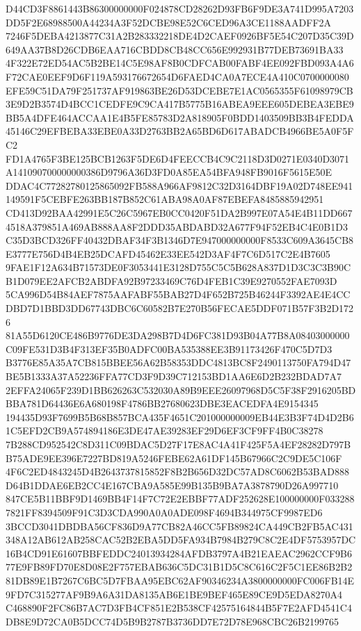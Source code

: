 \documentclass[UTF8,fontset=fandol,zihao=-4,a4paper]{ctexart}
\begin{document}
{{D44CD3F8861443B86300000000F024878CD28262D93FB6F9DE3A741D995A7203DD5F2E68988500A44234A3F52DCBE98E52C6CED96A3CE1188AADFF2A
7246F5DEBA4213877C31A2B283332218DE4D2CAEF0926BF5E54C207D35C39D649AA37B8D26CDB6EAA716CBDD8CB48CC656E992931B77DEB73691BA33
4F322E72ED54AC5B2BE14C5E98AF8B0CDFCAB00FABF4EE092FBD093A4A6F72CAE0EEF9D6F119A593176672654D6FAED4CA0A7ECE4A410C0700000080
EFE59C51DA79F251737AF919863BE26D53DCEBE7E1AC0565355F61098979CB3E9D2B3574D4BCC1CEDFE9C9CA417B5775B16ABEA9EEE605DEBEA3EBE9
BB5A4DFE464ACCAA1E4B5FE85783D2A818905F0BDD1403509BB3B4FEDDA45146C29EFBEBA33EBE0A33D2763BB2A65BD6D617ABADCB4966BE5A0F5FC2
FD1A4765F3BE125BCB1263F5DE6D4FEECCB4C9C2118D3D0271E0340D3071A141090700000000386D9796A36D3FD0A85EA54BFA948FB9016F5615E50E
DDAC4C77282780125865092FB588A966AF9812C32D3164DBF19A02D748EE941149591F5CEBFE263BB187B852C61ABA98A0AF87EBEFA8485885942951
CD413D92BAA42991E5C26C5967EB0CC0420F51DA2B997E07A54E4B11DD6674518A379851A469AB888AA8F2DDD35ABDABD32A677F94F52EB4C4E0B1D3
C35D3BCD326FF40432DBAF34F3B1346D7E947000000000F8533C609A3645CB8E3777E756D4B4EB25DCAFD45462E33EE542D3AF4F7C6D517C2E4B7605
9FAE1F12A634B71573DE0F3053441E3128D755C5C5B628A837D1D3C3C3B90CB1D079EE2AFCB2ABDFA92B97233469C76D4FEB1C39E9270552FAE7093D
5CA996D54B84AEF7875AAFABF55BAB27D4F652B725B46244F3392AE4E4CCDBD7D1BBD3DD67743DBC6C60582B7E270B56FECAE5DDF071B57F3B2D1726
81A55D6120CE486B9776DE3DA298B7D4D6FC381D93B04A77B8A08403000000C09FE531D3B4F313EF35B0ADFC00BA535388EE3B91173426F470C5D7D3
B3776E85A35A7CB815BBEE56A62B58353DDC4813BC8F2490113750FA794D47BE5B1333A37A52236FFA77CD3F9D39C712153BD1AA6E6D2B232BDAD7A7
2EFFA24065F239D1BB626263C532030A89B9EEE26097968D5C5F38F2916205BDBBA781D64436E6A680198F4786BB27680623DBE3EACEDFA4E9154345
194435D93F7699B5B68B857BCA435F4651C201000000009EB44E3B3F74D4D2B61C5EFD2CB9A574894186E3DE47AE39283EF29D6EF3CF9FF4B0C38278
7B288CD952542C8D311C09BDAC5D27F17E8AC4A41F425F5A4EF28282D797BB75ADE9EE396E7227BD819A5246FEBE62A61DF145B67966C2C9DE5C106F
4F6C2ED4843245D4B2643737815852F8B2B656D32DC57AD8C6062B53BAD888D64B1DDAE6EB2CC4E167CBA9A585E99B135B9BA7A3878790D26A997710
847CE5B11BBF9D1469BB4F14F7C72E2EBBF77ADF252628E100000000F0332887821FF8394509F91C3D3CDA990A0A0ADE098F4694B344975CF9987ED6
3BCCD3041DBDBA56CF836D9A77CB82A46CC5FB89824CA449CB2FB5AC431348A12AB612AB258CAC52B2EBA5DD5FA934B7984B279C8C2E4DF5753957DC
16B4CD91E61607BBFEDDC24013934284AFDB3797A4B21EAEAC2962CCF9B677E9FB89FD70E8D08E2F757EBAB636C5DC31B1D5C8C616C2F5C1EE86B2B2
81DB89E1B7267C6BC5D7FBAA95EBC62AF90346234A3800000000FC006FB14E9FD7C315277AF9B9A6A31DA8135AB6E1BE9BEF465E89CE9D5EDA8270A4
C468890F2FC86B7AC7D3FB4CF851E2B538CF42575164844B5F7E2AFD4541C4DB8E9D72CA0B5DCC74D5B9B2787B3736DD7E72D78E968CBC26B2199765
}}
\end{document}

